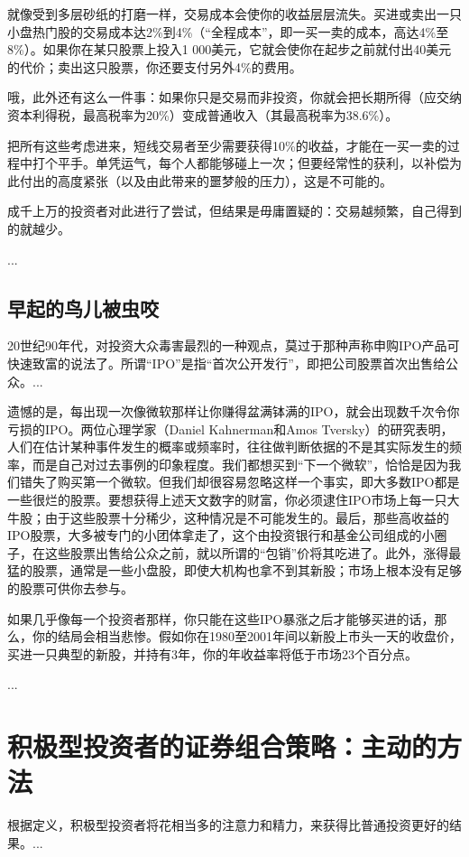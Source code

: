 \documentclass[12pt,oneside]{book}
\begin{document}
就像受到多层砂纸的打磨一样，交易成本会使你的收益层层流失。买进或卖出一只小盘热门股的交易成本达2\%到4\%（“全程成本”，即一买一卖的成本，高达4\%至8\%）。如果你在某只股票上投入1 000美元，它就会使你在起步之前就付出40美元的代价；卖出这只股票，你还要支付另外4\%的费用。

哦，此外还有这么一件事：如果你只是交易而非投资，你就会把长期所得（应交纳资本利得税，最高税率为20\%）变成普通收入（其最高税率为38.6\%）。

把所有这些考虑进来，短线交易者至少需要获得10\%的收益，才能在一买一卖的过程中打个平手。单凭运气，每个人都能够碰上一次；但要经常性的获利，以补偿为此付出的高度紧张（以及由此带来的噩梦般的压力），这是不可能的。

成千上万的投资者对此进行了尝试，但结果是毋庸置疑的：交易越频繁，自己得到的就越少。

...


\subsection{早起的鸟儿被虫咬}
20世纪90年代，对投资大众毒害最烈的一种观点，莫过于那种声称申购IPO产品可快速致富的说法了。所谓“IPO”是指“首次公开发行”，即把公司股票首次出售给公众。...

遗憾的是，每出现一次像微软那样让你赚得盆满钵满的IPO，就会出现数千次令你亏损的IPO。两位心理学家（Daniel Kahnerman和Amos Tversky）的研究表明，人们在估计某种事件发生的概率或频率时，往往做判断依据的不是其实际发生的频率，而是自己对过去事例的印象程度。我们都想买到“下一个微软”，恰恰是因为我们错失了购买第一个微软。但我们却很容易忽略这样一个事实，即大多数IPO都是一些很烂的股票。要想获得上述天文数字的财富，你必须逮住IPO市场上每一只大牛股；由于这些股票十分稀少，这种情况是不可能发生的。最后，那些高收益的IPO股票，大多被专门的小团体拿走了，这个由投资银行和基金公司组成的小圈子，在这些股票出售给公众之前，就以所谓的“包销”价将其吃进了。此外，涨得最猛的股票，通常是一些小盘股，即使大机构也拿不到其新股；市场上根本没有足够的股票可供你去参与。

如果几乎像每一个投资者那样，你只能在这些IPO暴涨之后才能够买进的话，那么，你的结局会相当悲惨。假如你在1980至2001年间以新股上市头一天的收盘价，买进一只典型的新股，并持有3年，你的年收益率将低于市场23个百分点。

...


\section{积极型投资者的证券组合策略：主动的方法}
根据定义，积极型投资者将花相当多的注意力和精力，来获得比普通投资更好的结果。...
\end{document}
